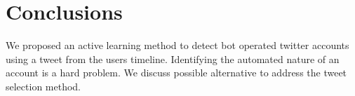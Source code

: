  
\section{Conclusions}

We proposed an active learning method to detect bot operated twitter accounts using a tweet from the users timeline. Identifying the automated nature of an account is a hard problem. We discuss possible alternative to address the tweet selection method. 

